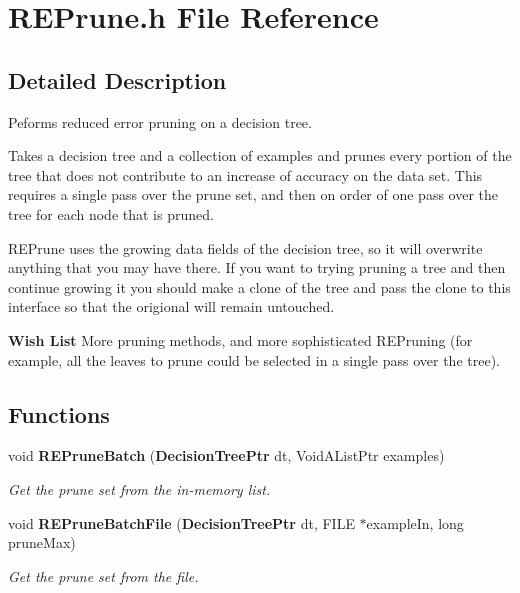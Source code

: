 \section{REPrune.h File Reference}
\label{REPrune_8h}


\subsection{Detailed Description}
Peforms reduced error pruning on a decision tree. 

Takes a decision tree and a collection of examples and prunes every portion of the tree that does not contribute to an increase of accuracy on the data set. This requires a single pass over the prune set, and then on order of one pass over the tree for each node that is pruned.

REPrune uses the growing data fields of the decision tree, so it will overwrite anything that you may have there. If you want to trying pruning a tree and then continue growing it you should make a clone of the tree and pass the clone to this interface so that the origional will remain untouched.

\begin{Desc}
\item[{\bf Wish List}]More pruning methods, and more sophisticated REPruning (for example, all the leaves to prune could be selected in a single pass over the tree). \end{Desc}


\subsection*{Functions}
\begin{CompactItemize}
\item 
void {\bf REPrune\-Batch} ({\bf Decision\-Tree\-Ptr} dt, Void\-AList\-Ptr examples)
\begin{CompactList}\small\item\em Get the prune set from the in-memory list. \item\end{CompactList}\item 
void {\bf REPrune\-Batch\-File} ({\bf Decision\-Tree\-Ptr} dt, FILE $\ast$example\-In, long prune\-Max)
\begin{CompactList}\small\item\em Get the prune set from the file. \item\end{CompactList}\end{CompactItemize}


